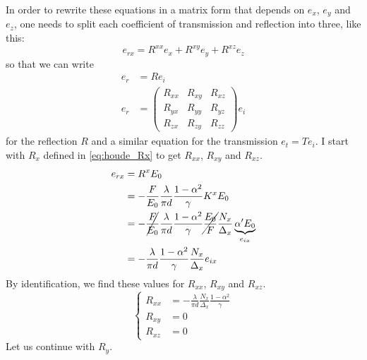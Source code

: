 In order to rewrite these equations in a matrix form that depends on $e_x$, $e_y$ and $e_z$, one needs to split each coefficient of transmission and reflection into three, like this:
\begin{equation}
    e_{rx} = R^{xx} e_x + R^{xy} e_y + R^{xz} e_z
\end{equation}
so that we can write
\begin{align}
    e_r &= R e_i \\
    e_r &=
    \begin{pmatrix}
        R_{xx} & R_{xy} & R_{xz} \\
        R_{yx} & R_{yy} & R_{yz} \\
        R_{zx} & R_{zy} & R_{zz}
    \end{pmatrix}
    e_i
\end{align}
for the reflection $R$ and a similar equation for the transmission $e_t = T e_i$.
I start with $R_x$ defined in \cref{eq:houde_Rx} to get $R_{xx}$, $R_{xy}$ and $R_{xz}$.
\begin{align*}
    e_{rx} &= R^x E_0
    \\
           &= -\frac{F}{E_0}
              \frac{\lambda}{\pi d}
              \frac{1-\alpha^2}{\gamma}
              K^x
              E_0
    \\
           &= -\cancel{\frac{F}{E_0}}
              \frac{\lambda}{\pi d}
              \frac{1-\alpha^2}{\gamma}
              \cancel{\frac{E_0}{F}}
              \frac{N_x}{\Delta_x}
              \underbrace{
                  \alpha'
                  E_0
              }_{e_{ix}}
    \\
           &= -\frac{\lambda}{\pi d}
              \frac{1-\alpha^2}{\gamma}
              \frac{N_x}{\Delta_x}
              e_{ix}
\end{align*}
By identification, we find these values for $R_{xx}$, $R_{xy}$ and $R_{xz}$.
\begin{equation}
    \left\lbrace
    \begin{aligned}
        R_{xx} &= -\frac{\lambda}{\pi d}
                  \frac{N_x}{\Delta_x}
                  \frac{1-\alpha^2}{\gamma}
        \\
        R_{xy} &= 0
        \\
        R_{xz} &= 0
    \end{aligned}
    \right.
\end{equation}
Let us continue with $R_y$.
